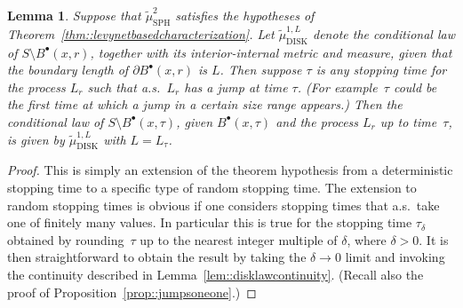 \documentclass[JEP,XML,SOM,Unicode]{cedram}
\newcommand{\sbullet}{{\scriptscriptstyle\bullet}}
\theoremstyle{plain}
\numberwithin{theorem}{section}
\newtheorem{lemma}[theorem]{Lemma}
\theoremstyle{definition}
\newcommand{\tmustwo}{\wt{\mu}_{\mathrm{SPH}}^2}
\newcommand{\tmudonel}{\wt{\mu}_{ \mathrm{DISK}}^{1, L}}
\let\wt\widetilde
\newcommand{\fb}[2]{B^\sbullet(#1,#2)}
\begin{document}
\begin{lemma}
\label{lem::markovatjumpstop}
Suppose that $\tmustwo$ satisfies the hypotheses of Theorem~\ref{thm::levynetbasedcharacterization}. Let $\tmudonel$ denote the conditional law of $S \setminus \fb{x}{r}$, together with its interior-internal metric and measure, given that the boundary length of $\partial \fb{x}{r}$ is $L$. Then suppose $\tau$ is any stopping time for the process $L_r$ such that a.s.\ $L_r$ has a jump at time $\tau$. (For example~$\tau$ could be the first time at which a jump in a certain size range appears.) Then the conditional law of $S \setminus \fb{x}{\tau}$, given $\fb{x}{\tau}$ and the process $L_r$ up to time~$\tau$, is given by $\tmudonel$ with $L= L_\tau$.
\end{lemma}
\begin{proof}
This is simply an extension of the theorem hypothesis from a deterministic stopping time to a specific type of random stopping time. The extension to random stopping times is obvious if one considers stopping times that a.s.\ take one of finitely many values. In particular this is true for the stopping time $\tau_\delta$ obtained by rounding~$\tau$ up to the nearest integer multiple of $\delta$, where $\delta>0$. It is then straightforward to obtain the result by taking the $\delta \to 0$ limit and invoking the continuity described in Lemma~\ref{lem::disklawcontinuity}. (Recall also the proof of Proposition~\ref{prop::jumpsoneone}.)
\end{proof}
\end{document}
